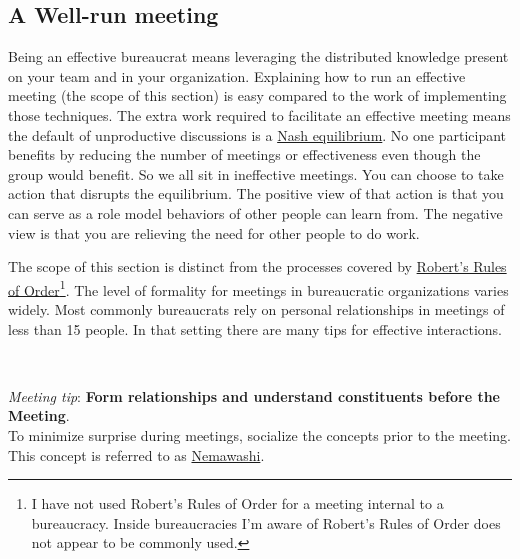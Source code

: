 \subsection*{A Well-run meeting\label{sec:well-run-meeting}}

Being an effective bureaucrat means leveraging the distributed knowledge present on your team and in your organization.
Explaining how to run an effective meeting (the scope of this section) is easy compared to the work of implementing those techniques. The extra work required to facilitate an effective meeting means the default of unproductive discussions is a \href{https://en.wikipedia.org/wiki/Nash_equilibrium}{Nash equilibrium}. 
No one participant benefits by reducing the number of meetings or effectiveness even though the group would benefit. So we all sit in ineffective meetings. You can choose to take action that disrupts the equilibrium. The positive view of that action is that you can serve as a role model behaviors of other people can learn from. The negative view is that you are relieving the need for other people to do work.



The scope of this section is distinct from the processes covered by \href{https://en.wikipedia.org/wiki/Robert\%27s_Rules_of_Order}{Robert's Rules of Order}\footnote{I have not used Robert's Rules of Order for a meeting internal to a bureaucracy. Inside bureaucracies I'm aware of Robert's Rules of Order does not appear to be commonly used.}. 
The level of formality for meetings in bureaucratic organizations varies widely. Most commonly bureaucrats rely on personal relationships in meetings of less than 15 people. In that setting there are many tips for effective interactions.


\ \\
\begin{samepage}
\textit{Meeting tip}: \textbf{Form relationships and understand constituents before the Meeting}.\\
To minimize surprise during meetings, socialize the concepts prior to the meeting. This concept is referred to as 
\href{https://en.wikipedia.org/wiki/Nemawashi}{Nemawashi}.
\end{samepage}

